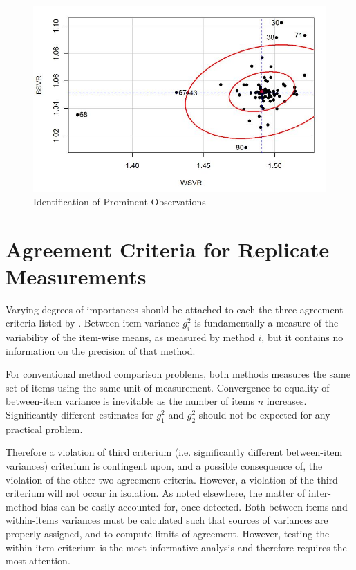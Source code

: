 \documentclass[12pt, a4paper]{report}
\theoremstyle{definition}
\theoremstyle{remark}
\begin{document}
\begin{figure}[h!]
\centering
\includegraphics[width=0.9\linewidth]{08-plot1}
\caption{Identification of Prominent Observations}
\label{fig:08-plot1}
\end{figure}








\section{Agreement Criteria for Replicate Measurements}


Varying degrees of importances should be attached to each the three agreement criteria listed by \citet{Barnhart}. Between-item variance $g^2_i$ is fundamentally a measure of the variability of the item-wise means, as measured by method $i$, but it contains no information on the precision of that method. 

For conventional method comparison problems, both methods measures the same set of items using the same unit of measurement. Convergence to equality of between-item variance is inevitable as the number of items $n$ increases. Significantly different estimates for $g^2_1$ and $g^2_2$ should not be expected for any practical problem. 

Therefore a violation of third criterium (i.e. significantly different between-item variances) criterium is contingent upon, and a  
possible consequence of, the violation of the other two agreement criteria. However, a violation of the third criterium will not occur in isolation. As noted elsewhere, the matter of inter-method bias can be easily accounted for, once detected. Both between-items and within-items variances must be calculated such that sources of variances are properly assigned, and to compute limits of agreement. However, testing the within-item criterium is the most informative analysis and therefore requires the most attention. 
\end{document}
